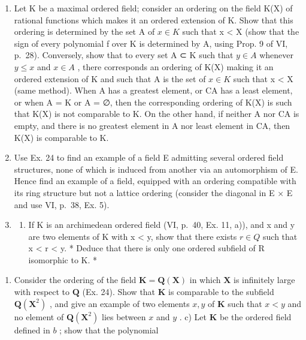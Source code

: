 \begin{enumerate}
\def\labelenumi{\arabic{enumi})}
\setcounter{enumi}{23}
\item
  Let K be a maximal ordered field; consider an ordering on the field K(X) of rational functions which makes it an ordered extension of K. Show that this ordering is determined by the set A of \(x \in K\) such that x \textless{} X (show that the sign of every polynomial f over K is determined by A, using Prop. 9 of VI, p.~28). Conversely, show that to every set A ⊂ K such that \(y \in A\) whenever \(y \leqslant x\) and \(x \in A\) , there corresponds an ordering of K(X) making it an ordered extension of K and such that A is the set of \(x \in K\) such that x \textless{} X (same method). When A has a greatest element, or CA has a least element, or when A = K or A = ∅, then the corresponding ordering of K(X) is such that K(X) is not comparable to K. On the other hand, if neither A nor CA is empty, and there is no greatest element in A nor least element in CA, then K(X) is comparable to K.
\item
  Use Ex. 24 to find an example of a field E admitting several ordered field structures, none of which is induced from another via an automorphism of E. Hence find an example of a field, equipped with an ordering compatible with its ring structure but not a lattice ordering (consider the diagonal in E × E and use VI, p.~38, Ex. 5).
\item
  \begin{enumerate}
  \def\labelenumii{\alph{enumii})}
  \tightlist
  \item
    If K is an archimedean ordered field (VI, p.~40, Ex. 11, a)), and x and y are two elements of K with x \textless{} y, show that there exists \(r \in Q\) such that x \textless{} r \textless{} y. * Deduce that there is only one ordered subfield of R isomorphic to K. *
  \end{enumerate}
\end{enumerate}

\begin{enumerate}
\def\labelenumi{\alph{enumi})}
\setcounter{enumi}{1}
\tightlist
\item
  Consider the ordering of the field \(\mathbf{K} = \mathbf{Q}(\mathbf{X})\) in which \(\mathbf{X}\) is infinitely large with respect to \(\mathbf{Q}\) (Ex. 24). Show that \(\mathbf{K}\) is comparable to the subfield \(\mathbf{Q}(\mathbf{X}^2)\) , and give an example of two elements \(x, y\) of \(\mathbf{K}\) such that \(x < y\) and no element of \(\mathbf{Q}(\mathbf{X}^2)\) lies between \(x\) and \(y\) . c) Let \(\mathbf{K}\) be the ordered field defined in \(b\) ; show that the polynomial
\end{enumerate}

